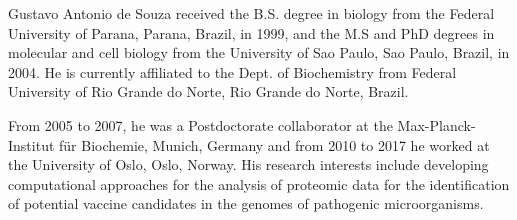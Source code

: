 \documentclass{ieeeaccess}
\begin{document}


\begin{IEEEbiography}{Gustavo Antonio de Souza} received the B.S. degree in biology from the Federal University of Parana, Parana, Brazil, in 1999, and the M.S and PhD degrees in molecular and cell biology from the University of Sao Paulo, Sao Paulo, Brazil, in 2004. He is currently affiliated to the Dept. of Biochemistry from Federal University of Rio Grande do Norte, Rio Grande do Norte, Brazil.

From 2005 to 2007, he was a Postdoctorate collaborator at the Max-Planck-Institut für Biochemie, Munich, Germany and from 2010 to 2017 he worked at the University of Oslo, Oslo, Norway. His research interests include developing computational approaches for the analysis of proteomic data for the identification of potential vaccine candidates in the genomes of pathogenic microorganisms.
\end{IEEEbiography}





\EOD
\end{document}
